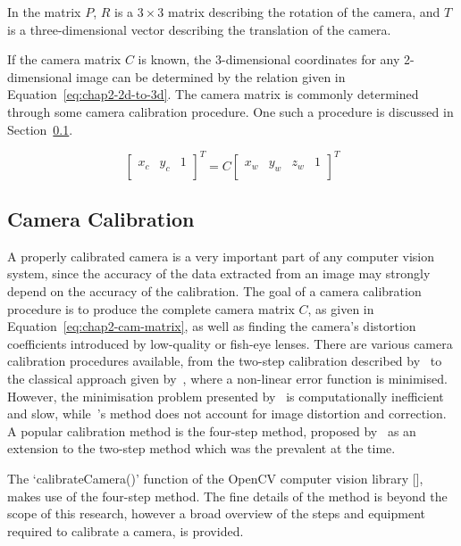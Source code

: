 In the matrix $P$, $R$ is a $3\times3$ matrix describing the rotation of the camera, and $T$ is a three-dimensional vector describing the translation of the camera. 


If the camera matrix $C$ is known, the 3-dimensional coordinates for any 2-dimensional image can be determined by the relation given in Equation~\ref{eq:chap2-2d-to-3d}. The camera matrix is commonly determined through some camera calibration procedure. One such a procedure is discussed in Section~\ref{sec:chap2-cam-calibration}.

\begin{equation}
   \label{eq:chap2-2d-to-3d}
   \begin{bmatrix}
     x_c & y_c & 1 \\
   \end{bmatrix}^T
   = C
   \begin{bmatrix}
     x_w & y_w & z_w & 1 \\
   \end{bmatrix}^T
 \end{equation}

\subsection{Camera Calibration}
\label{sec:chap2-cam-calibration}

A properly calibrated camera is a very important part of any computer vision system, since the accuracy of the data extracted from an image may strongly depend on the accuracy of the calibration. The goal of a camera calibration procedure is to produce the complete camera matrix $C$, as given in Equation~\ref{eq:chap2-cam-matrix}, as well as finding the camera's distortion coefficients introduced by low-quality or fish-eye lenses. There are various camera calibration procedures available, from the two-step calibration described by~\cite{melen1994geometrical} to the classical approach given by~\cite{slama1980manual}, where a non-linear error function is minimised. However, the minimisation problem presented by~\citeauthor{slama1980manual} is computationally inefficient and slow, while~\citeauthor{melen1994geometrical}'s method does not account for image distortion and correction. A popular calibration method is the four-step method, proposed by~\cite{heikkila1997four} as an extension to the two-step method which was the prevalent at the time.

The `calibrateCamera()' function of the OpenCV computer vision library [\cite{bradski2000opencv}], makes use of the four-step method. The fine details of the method is beyond the scope of this research, however a broad overview of the steps and equipment required to calibrate a camera, is provided. 

